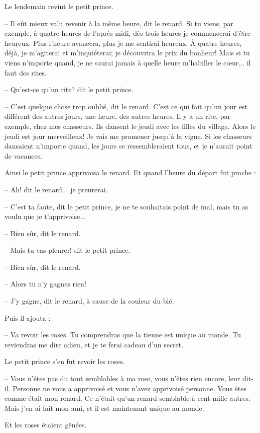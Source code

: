 \documentclass[a4paper]{report}
\begin{document}
Le lendemain revint le petit prince.

-- Il eût mieux valu revenir à la même heure, dit le renard. Si tu viens, par exemple, à quatre heures de l'après-midi, dès trois heures je commencerai d'être heureux. Plus l'heure avancera, plus je me sentirai heureux. À quatre heures, déjà, je m'agiterai et m'inquiéterai; je découvrira le prix du bonheur! Mais si tu viens n'importe quand, je ne saurai jamais à quelle heure m'habiller le cœur... il faut des rites.

-- Qu'est-ce qu'un rite? dit le petit prince.

-- C'est quelque chose trop oublié, dit le renard. C'est ce qui fait qu'un jour est différent des autres jours, une heure, des autres heures. Il y a un rite, par exemple, chez mes chasseurs. Ils dansent le jeudi avec les filles du village. Alors le jeudi est jour merveilleux! Je vais me promener jusqu'à la vigne. Si les chasseurs dansaient n'importe quand, les jours se ressembleraient tous, et je n'aurait point de vacances.


Ainsi le petit prince apprivoisa le renard. Et quand l'heure du départ fut proche :

-- Ah! dit le renard... je preurerai.

-- C'est ta faute, dit le petit prince, je ne te souhaitais point de mal, mais tu as voulu que je t'apprivoise...

-- Bien sûr, dit le renard.

-- Mais tu vas pleurer! dit le petit prince.

-- Bien sûr, dit le renard.

-- Alors tu n'y gagnes rien!

-- J'y gagne, dit le renard, à cause de la couleur du blé.

Puis il ajouta :

-- Va revoir les roses. Tu comprendras que la tienne est unique au monde. Tu reviendras me dire adieu, et je te ferai cadeau d'un secret.

Le petit prince s'en fut revoir les roses.

-- Vous n'êtes pas du tout semblables à ma rose, vous n'êtes rien encore, leur dit-il. Personne ne vous a apprivoisé et vous n'avez apprivoisé personne. Vous êtes comme était mon renard. Ce n'était qu'un renard semblable à cent mille autres. Mais j'en ai fait mon ami, et il est maintenant unique au monde.

Et les roses étaient gênées.
\end{document}
